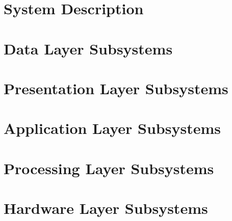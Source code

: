 \documentclass[11pt,letterpaper]{article}
\begin{document}
\section{System Description}

\newpage

\section{Data Layer Subsystems}

\newpage

\section{Presentation Layer Subsystems}

\newpage

\section{Application Layer Subsystems}

\newpage

\section{Processing Layer Subsystems}

\newpage

\section{Hardware Layer Subsystems}

\newpage
\end{document}
